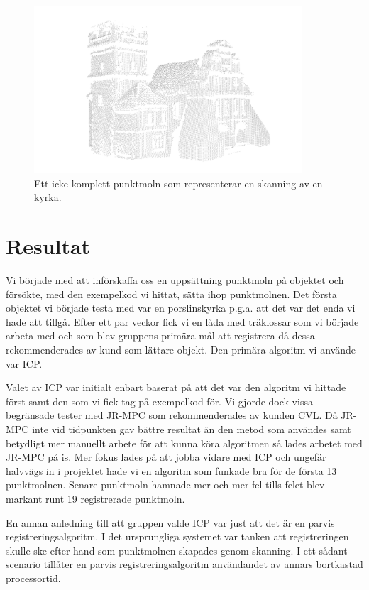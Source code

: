 \begin{figure}[H]
	\centering
	\includegraphics[width=100mm]{figures/icke_komplett_moln_kyrka.png}
	\caption{Ett icke komplett punktmoln som representerar en skanning av en kyrka.}
	\label{fig:karlsson-single_scan-church}
\end{figure}


\section{Resultat}
\label{sec:results-karlsson}

Vi började med att införskaffa oss en uppsättning punktmoln på objektet och försökte, med den exempelkod vi hittat, sätta ihop punktmolnen. Det första objektet vi började testa med var en porslinskyrka p.g.a. att det var det enda vi hade att tillgå. Efter ett par veckor fick vi en låda med träklossar som vi började arbeta med och som blev gruppens primära mål att registrera då dessa rekommenderades av kund som lättare objekt. Den primära algoritm vi använde var ICP. 

Valet av ICP var initialt enbart baserat på att det var den algoritm vi hittade först samt den som vi fick tag på exempelkod för. Vi gjorde dock vissa begränsade tester med JR-MPC som rekommenderades av kunden CVL. Då JR-MPC inte vid tidpunkten gav bättre resultat än den metod som användes samt betydligt mer manuellt arbete för att kunna köra algoritmen så lades arbetet med JR-MPC på is. Mer fokus lades på att jobba vidare med ICP och ungefär halvvägs in i projektet hade vi en algoritm som funkade bra för de första 13 punktmolnen. Senare punktmoln hamnade mer och mer fel tills felet blev markant runt 19 registrerade punktmoln. 

En annan anledning till att gruppen valde ICP var just att det är en parvis registreringsalgoritm. I det ursprungliga systemet var tanken att registreringen skulle ske efter hand som punktmolnen skapades genom skanning. I ett sådant scenario tillåter en parvis registreringsalgoritm användandet av annars bortkastad processortid.



